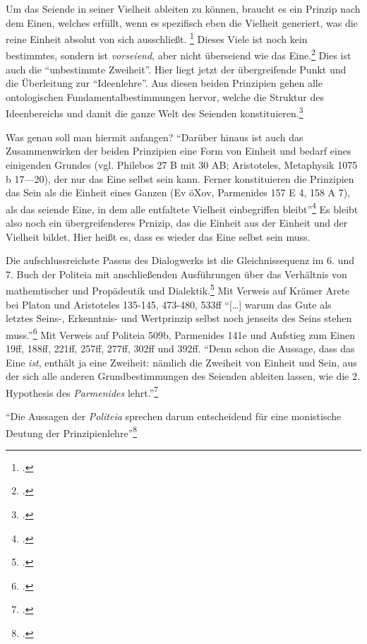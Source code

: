 Um das Seiende in seiner Vielheit ableiten zu können, braucht es ein Prinzip nach dem Einen, welches erfüllt, wenn es spezifisch eben die Vielheit generiert, was die reine Einheit absolut von sich ausschließt. \footcite[vgl.][S. 103]{halfwassen2015spuren} Dieses Viele ist noch kein bestimmtes, sondern ist \emph{vorseiend}, aber nicht überseiend wie das Eine.\footcite[vgl.][S. 103]{halfwassen2015spuren} Dies ist auch die \enquote{unbestimmte Zweiheit}.
Hier liegt jetzt der übergreifende Punkt und die Überleitung zur \enquote{Ideenlehre}. Aus diesen beiden Prinzipien gehen alle ontologischen Fundamentalbestimmungen hervor, welche die Struktur des Ideenbereichs und damit die ganze Welt des Seienden konstituieren.\footcite[vgl.][S. 104]{halfwassen2015spuren}

Was genau soll man hiermit anfangen? \enquote{Darüber hinaus ist auch das Zusammenwirken der beiden Prinzipien eine Form von Einheit und bedarf eines einigenden Grundes (vgl. Philebos 27 B mit 30 AB; Aristoteles, Metaphysik 1075 b 17—20), der nur das Eine selbst sein kann. Ferner konstituieren die Prinzipien das Sein als die Einheit eines Ganzen (Ev öXov, Parmenides 157 E 4, 158 A 7), als das seiende Eine, in dem alle entfaltete Vielheit einbegriffen bleibt}\footcite[][S. 106]{halfwassen2015spuren}
Es bleibt also noch ein übergreifenderes Prnizip, das die Einheit aus der Einheit und der Vielheit bildet. Hier heißt es, dass es wieder das Eine selbst sein muss.

Die aufschlussreichste Passus des Dialogwerks ist die Gleichnissequenz im 6. und 7. Buch der Politeia mit anschließenden Ausführungen über das Verhältnis von mathemtischer und Propädeutik und Dialektik.\footcite[vgl.][S. 135]{halfwassen2015spuren} Mit Verweis auf Krämer Arete bei Platon und Aristoteles 135-145, 473-480, 533ff
\enquote{[\dots] warum das Gute als letztes Seins-, Erkenntnis- und Wertprinzip selbst noch jenseits des Seins stehen muss.}\footcite[vgl.][S. 136]{halfwassen2015spuren} Mit Verweis auf Politeia 509b, Parmenides 141e und Aufstieg zum Einen 19ff, 188ff, 221ff, 257ff, 277ff, 302ff und 392ff. 
\enquote{Denn schon die Aussage, dass das Eine \emph{ist}, enthält ja eine Zweiheit: nämlich die Zweiheit von Einheit und Sein, aus der sich alle anderen Grundbestimmungen des Seienden ableiten lassen, wie die 2. Hypothesis des \emph{Parmenides} lehrt.}\footcite[][S. 136f.]{halfwassen2015spuren}

\enquote{Die Aussagen der \emph{Politeia} sprechen darum entscheidend für eine monistische Deutung der Prinzipienlehre}\footcite[][S. 137]{halfwassen2015spuren}



